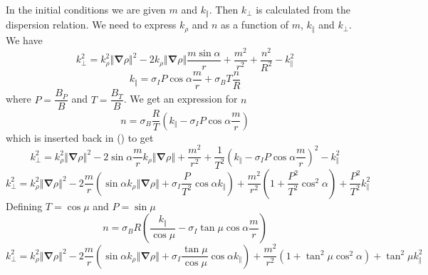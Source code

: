 \documentclass[a4paper,12pt]{article}%
\begin{document}
In the initial conditions we are given $m$ and $k_{\Vert}$. Then $k_{\bot}$ is
calculated from the dispersion relation. We need to express $k_{\rho}$ and $n$
as a function of $m$, $k_{\Vert}$ and $k_{\bot}$. We have%
\begin{equation}
k_{\bot}^{2}=k_{\rho}^{2}\left\Vert \mathbf{\nabla}\rho\right\Vert
^{2}-2k_{\rho}\left\Vert \mathbf{\nabla}\rho\right\Vert \dfrac{m\sin\alpha}%
{r}+\dfrac{m^{2}}{r^{2}}+\dfrac{n^{2}}{R^{2}}-k_{\Vert}^{2}%
\end{equation}%
\begin{equation}
k_{\Vert}=\sigma_{I}P\cos\alpha\dfrac{m}{r}+\sigma_{B}T\dfrac{n}{R}%
\end{equation}
where $P=\dfrac{B_{P}}{B}$ and $T=\dfrac{B_{T}}{B}$. We get an expression for
$n$%
\begin{equation}
n=\sigma_{B}\dfrac{R}{T}\left(  k_{\Vert}-\sigma_{I}P\cos\alpha\dfrac{m}%
{r}\right)
\end{equation}
which is inserted back in () to get%
\begin{equation}
k_{\bot}^{2}=k_{\rho}^{2}\left\Vert \mathbf{\nabla}\rho\right\Vert ^{2}%
-2\sin\alpha\dfrac{m}{r}k_{\rho}\left\Vert \mathbf{\nabla}\rho\right\Vert
+\dfrac{m^{2}}{r^{2}}+\dfrac{1}{T^{2}}\left(  k_{\Vert}-\sigma_{I}P\cos
\alpha\dfrac{m}{r}\right)  ^{2}-k_{\Vert}^{2}%
\end{equation}%
\begin{equation}
k_{\bot}^{2}=k_{\rho}^{2}\left\Vert \mathbf{\nabla}\rho\right\Vert
^{2}-2\dfrac{m}{r}\left(  \sin\alpha k_{\rho}\left\Vert \mathbf{\nabla}%
\rho\right\Vert +\sigma_{I}\dfrac{P}{T^{2}}\cos\alpha k_{\Vert}\right)
+\dfrac{m^{2}}{r^{2}}\left(  1+\dfrac{P^{2}}{T^{2}}\cos^{2}\alpha\right)
+\dfrac{P^{2}}{T^{2}}k_{\Vert}^{2}%
\end{equation}
Defining $T=\cos\mu$ and $P=\sin\mu$%
\begin{equation}
n=\sigma_{B}R\left(  \dfrac{k_{\Vert}}{\cos\mu}-\sigma_{I}\tan\mu\cos
\alpha\dfrac{m}{r}\right)
\end{equation}%
\begin{equation}
k_{\bot}^{2}=k_{\rho}^{2}\left\Vert \mathbf{\nabla}\rho\right\Vert
^{2}-2\dfrac{m}{r}\left(  \sin\alpha k_{\rho}\left\Vert \mathbf{\nabla}%
\rho\right\Vert +\sigma_{I}\dfrac{\tan\mu}{\cos\mu}\cos\alpha k_{\Vert
}\right)  +\dfrac{m^{2}}{r^{2}}\left(  1+\tan^{2}\mu\cos^{2}\alpha\right)
+\tan^{2}\mu k_{\Vert}^{2}%
\end{equation}
\end{document}
